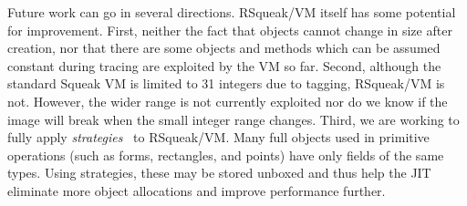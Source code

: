 \documentclass[
10pt,          %
]{sigplanconf}
\begin{document}
Future work can go in several directions. RSqueak/VM itself has some
potential for improvement. First, neither the fact that objects cannot
change in size after creation, nor that there are some objects and
methods which can be assumed constant during tracing are exploited by
the \ac{VM} so far. Second, although the standard Squeak \ac{VM} is limited to
\SI{31}{\bit} integers due to tagging, RSqueak/VM is not. However, the wider
range is not currently exploited nor do we know if the image will
break when the small integer range changes. Third, we are
working to fully apply \emph{strategies}~\cite{bolz2013storage} to
RSqueak/VM. Many full objects used in primitive operations (such as
forms, rectangles, and points) have only fields of the same
types. Using strategies, these may be stored unboxed and thus help the
\ac{JIT} eliminate more object allocations and improve performance further.



\end{document}
